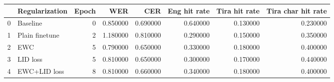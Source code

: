 \begin{tabular}{llrrrrrr}
\toprule
 & Regularization & Epoch & WER & CER & Eng hit rate & Tira hit rate & Tira char hit rate \\
\midrule
0 & Baseline & 0 & 0.850000 & 0.690000 & 0.640000 & 0.130000 & 0.230000 \\
1 & Plain finetune & 2 & 1.180000 & 0.810000 & 0.290000 & 0.150000 & 0.350000 \\
2 & EWC & 5 & 0.790000 & 0.650000 & 0.330000 & 0.180000 & 0.400000 \\
3 & LID loss & 5 & 0.810000 & 0.650000 & 0.300000 & 0.170000 & 0.440000 \\
4 & EWC+LID loss & 8 & 0.810000 & 0.660000 & 0.340000 & 0.180000 & 0.400000 \\
\bottomrule
\end{tabular}
